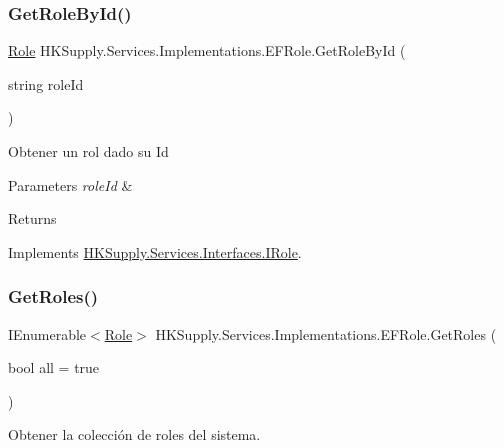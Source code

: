 \subsubsection{\texorpdfstring{Get\+Role\+By\+Id()}{GetRoleById()}}
{\footnotesize\ttfamily \mbox{\hyperlink{class_h_k_supply_1_1_models_1_1_role}{Role}} H\+K\+Supply.\+Services.\+Implementations.\+E\+F\+Role.\+Get\+Role\+By\+Id (\begin{DoxyParamCaption}\item[{string}]{role\+Id }\end{DoxyParamCaption})}



Obtener un rol dado su Id 


\begin{DoxyParams}{Parameters}
{\em role\+Id} & \\
\hline
\end{DoxyParams}
\begin{DoxyReturn}{Returns}

\end{DoxyReturn}


Implements \mbox{\hyperlink{interface_h_k_supply_1_1_services_1_1_interfaces_1_1_i_role}{H\+K\+Supply.\+Services.\+Interfaces.\+I\+Role}}.

\mbox{\label{class_h_k_supply_1_1_services_1_1_implementations_1_1_e_f_role_a7fd2f7f9bae498128f23ad0659e3ec4a}} 
\subsubsection{\texorpdfstring{Get\+Roles()}{GetRoles()}}
{\footnotesize\ttfamily I\+Enumerable$<$\mbox{\hyperlink{class_h_k_supply_1_1_models_1_1_role}{Role}}$>$ H\+K\+Supply.\+Services.\+Implementations.\+E\+F\+Role.\+Get\+Roles (\begin{DoxyParamCaption}\item[{bool}]{all = {\ttfamily true} }\end{DoxyParamCaption})}



Obtener la colección de roles del sistema. 


